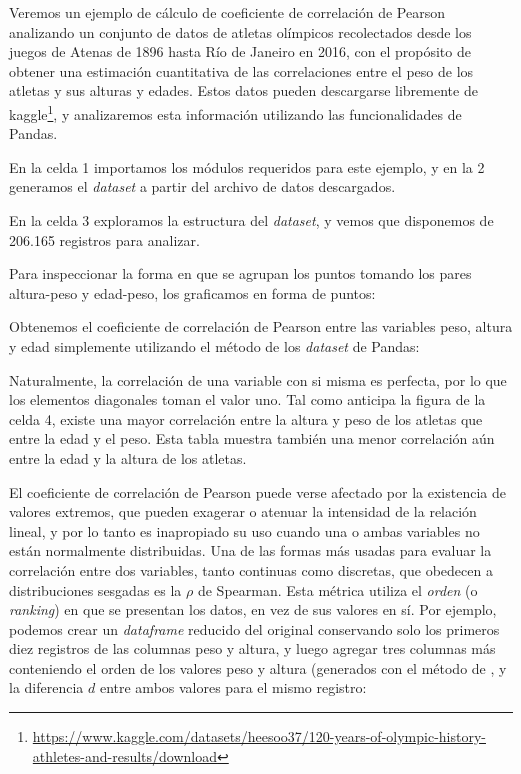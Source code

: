 Veremos un ejemplo de cálculo de coeficiente de correlación de Pearson analizando un conjunto de datos de atletas olímpicos recolectados desde los juegos de Atenas de 1896 hasta Río de Janeiro en 2016, con el propósito de obtener una estimación cuantitativa de las correlaciones entre el peso de los atletas y sus alturas y edades. Estos datos pueden descargarse libremente de kaggle\footnote{\url{https://www.kaggle.com/datasets/heesoo37/120-years-of-olympic-history-athletes-and-results/download}}, y analizaremos esta información utilizando las funcionalidades de Pandas.

En la celda 1 importamos los módulos requeridos para este ejemplo, y en la 2 generamos el \textit{dataset} a partir del archivo de datos descargados.



En la celda 3 exploramos la estructura del \textit{dataset}, y vemos que disponemos de 206.165 registros para analizar.


Para inspeccionar la forma en que se agrupan los puntos tomando los pares altura-peso y edad-peso, los graficamos en forma de puntos:


Obtenemos el coeficiente de correlación de Pearson entre las variables peso, altura y edad simplemente utilizando el método  de los \textit{dataset} de Pandas:


Naturalmente, la correlación de una variable con si misma es perfecta, por lo que los elementos diagonales toman el valor uno. Tal como anticipa la figura de la celda 4, existe una mayor correlación entre la altura y peso de los atletas que entre la edad y el peso. Esta tabla muestra también una menor correlación aún entre la edad y la altura de los atletas.

El coeficiente de correlación de Pearson puede verse afectado por la existencia de valores extremos, que pueden exagerar o atenuar la intensidad de la relación lineal, y por lo tanto es inapropiado su uso cuando una o ambas variables no están normalmente distribuidas. Una de las formas más usadas para evaluar la correlación entre dos variables, tanto continuas como discretas, que obedecen a distribuciones sesgadas es la $\rho$ de Spearman. Esta métrica utiliza el \textit{orden} (o \textit{ranking}) en que se presentan los datos, en vez de sus valores en sí. Por ejemplo, podemos crear un \textit{dataframe} reducido del original conservando solo los primeros diez registros de las columnas peso y altura, y luego agregar tres columnas más conteniendo el orden de los valores peso y altura (generados con el método  de , y la diferencia $d$ entre ambos valores para el mismo registro:

